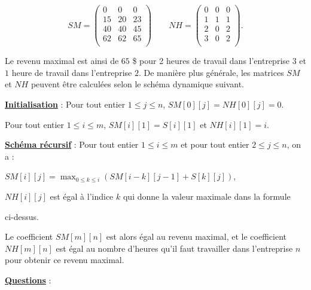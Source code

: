 \documentclass[11pt]{article}
\begin{document}
$$SM=\left( \begin{matrix}
0 & 0 & 0  \\
15 & 20 & 23  \\
40 & 40 & 45  \\
 62& 62 & 65  \\
\end{matrix}  \right) \,\,\,  \,\,\,  \,\,\,  \,\,\, NH=\left( \begin{matrix}
0 & 0 & 0   \\
 1& 1 & 1  \\
2 &0 & 2  \\
3 & 0 & 2  \\
\end{matrix}  \right).  $$

Le revenu maximal est ainsi de $65$ \$ pour 2 heures de travail dans l'entreprise $3$ et $1$ heure de travail dans l'entreprise $2$. De manière plus générale, les matrices $SM$ et $NH$ peuvent être calculées selon le schéma dynamique suivant.

\smallskip

\underline{\bf Initialisation} : \hspace{0.44 cm} Pour tout entier  $1\leq j \leq n$, $SM[0][j]=NH[0][j]=0$.

\smallskip

\hspace{3.32 cm} Pour tout entier  $1\leq i \leq m$, $SM[i][1]=S[i][1]$ et $NH[i][1]=i$.


\medskip

\underline{\bf Schéma récursif} : Pour tout entier  $1 \leq i \leq m$ et pour tout entier  $2 \leq j \leq n$, on a :

\smallskip

\hspace{3.32 cm} $SM[i][j]=\max_{0\leq k \leq i}\left(SM[i-k][j-1]+S[k][j]  \right)$,

\smallskip


\hspace{3.32 cm} $NH[i][j]$ est égal à l'indice $k$ qui donne la valeur maximale dans la formule

 \hspace{3.32 cm} ci-dessus.

\bigskip
Le coefficient $SM[m][n]$ est alors égal au revenu maximal, et le coefficient $NH[m][n]$ est égal au nombre d'heures qu'il faut travailler dans l'entreprise $n$ pour obtenir ce revenu maximal.

\bigskip

\textbf{\underline{Questions}} : 
\end{document}
